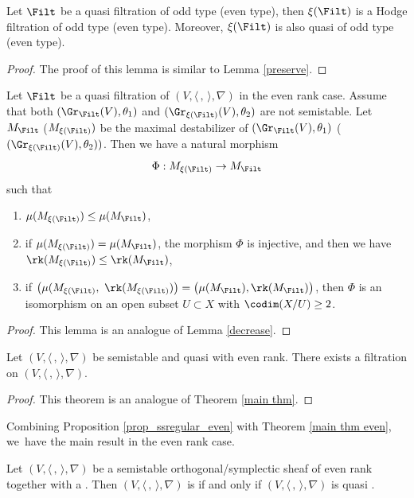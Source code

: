 \begin{lem}
Let $\Filt$ be a quasi \grsemistable filtration of odd type (\resp even type), then $\xi(\Filt)$ is a Hodge filtration of odd type (\resp even type). Moreover, $\xi(\Filt)$ is also quasi \grsemistable of odd type (\resp even type).
\end{lem}

\begin{proof}
The proof of this lemma is similar to Lemma \ref{preserve}.
\end{proof}

\begin{lem}
Let $\Filt$ be a quasi \grsemistable filtration of $(V,\langle \,, \, \rangle,\nabla)$ in the even rank case. Assume that both $(\Gr_{\Filt}(V),\theta_1)$ and $(\Gr_{\xi(\Filt)}(V),\theta_2)$ are not semistable. Let $M_{\Filt}$ (\resp $M_{\xi(\Filt)})$ be the maximal destabilizer of $(\Gr_{\Filt}(V),\theta_1)$ (\resp $(\Gr_{\xi(\Filt)}(V),\theta_2))$. Then we have a natural morphism
\[
\Phi: M_{\xi(\Filt)}\to M_{\Filt}
\]
such that
\begin{enumerate}
\item $\mu(M_{\xi(\Filt)})\leq \mu(M_{\Filt})$,

\item if $\mu(M_{\xi(\Filt)})= \mu(M_{\Filt})$, the morphism $\Phi$ is injective, and then we have $\rk(M_{\xi(\Filt)})\leq\rk(M_{\Filt})$,

\item if $\big(\mu(M_{\xi(\Filt)},\ \rk(M_{\xi(\Filt)})\big)= \big(\mu(M_{\Filt}),\rk(M_{\Filt})\big)$, then $\Phi$ is an isomorphism on an open subset $U \subset X$ with $\codim(X/U) \geq 2$.
\end{enumerate}
\end{lem}

\begin{proof}
This lemma is an analogue of Lemma \ref{decrease}.
\end{proof}

\begin{thm}\label{main thm even}
Let $(V,\langle \,, \, \rangle,\nabla)$ be semistable and quasi \grsemistable with even rank. There exists a \grsemistable filtration on $(V,\langle \,, \, \rangle,\nabla)$.
\end{thm}

\begin{proof}
This theorem is an analogue of Theorem \ref{main thm}.
\end{proof}

Combining Proposition \ref{prop_ssregular_even} with Theorem \ref{main thm even}, we~have the main result in the even rank case.
\begin{thm}\label{thm_even}
Let $(V,\langle \,, \, \rangle,\nabla)$ be a semistable orthogonal/symplectic sheaf of even rank together with a \lconnection. Then $(V,\langle \,, \, \rangle,\nabla)$ is \grsemistable if and only if $(V,\langle \,, \, \rangle,\nabla)$ is quasi \grsemistable.
\end{thm}


